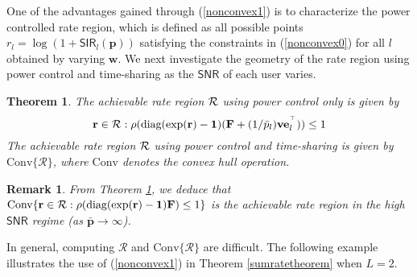 \documentclass[10pt,twocolumn]{IEEEtran}
\newcommand{\0}{\mathbf{0}}
\newcommand{\1}{\mathbf{1}}
\newcommand{\trans}{^\top}
\newtheorem{theorem}{Theorem}
\newtheorem{remark}{Remark}
\begin{document}
One of the advantages gained through (\ref{nonconvex1}) is to characterize the power controlled rate region, which is defined as all possible points $r_l=\log(1+\mathsf{SIR}_l(\mathbf{p}))$ satisfying the constraints in (\ref{nonconvex0}) for all $l$ obtained by varying $\mathbf{w}$. We next investigate the geometry of the rate region using power control and time-sharing as the $\mathsf{SNR}$ of each user varies. 

\begin{theorem}
\label{Luserrateregioncorollary}
The achievable rate region $\cal{R}$ using power control only is given by
\begin{equation}
\label{Luserrateregion}
\mathbf{r} \in \mbox{$\cal{R}$} : 
\rho(\mbox{diag}(\exp (\mathbf{r}) - \mathbf{1})(\mathbf{F}+(1/\bar{p}_l)\mathbf{v}\mathbf{e}^{\trans}_l)) \le 1
\end{equation}
The achievable rate region $\cal{R}$ using power control and time-sharing is given by $\mbox{Conv}\{ \mathcal{R} \}$,
where $\mbox{Conv}$ denotes the convex hull operation.
\end{theorem}

\begin{remark}
From Theorem \ref{Luserrateregioncorollary}, we deduce that $\mbox{Conv}\{ \mathbf{r} \in \mbox{$\cal{R}$} : \rho(\mbox{diag}(\exp (\mathbf{r})-\mathbf{1})\mathbf{F}) \le 1 \}$ is the achievable rate region in the high $\mathsf{SNR}$ regime (as $\mathbf{\bar{p}} \to \infty$).
\end{remark}

In general, computing $\mathcal{R}$ and $\mbox{Conv}\{\mathcal{R}\}$ are difficult. The following example illustrates the use of (\ref{nonconvex1}) in Theorem \ref{sumratetheorem} when $L=2$.
\end{document}
